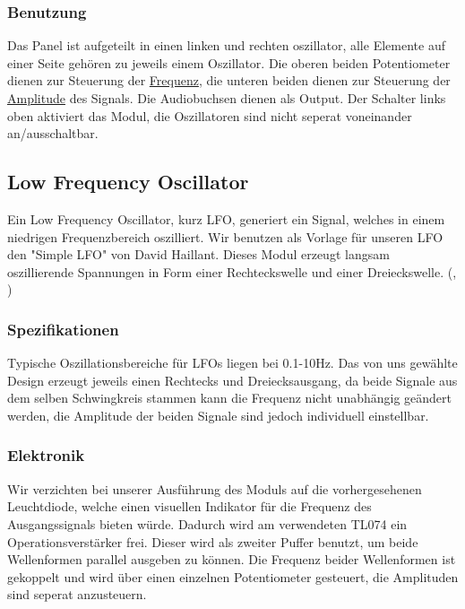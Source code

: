 \subsubsection{Benutzung}
\label{sec:orgfd612d0}
Das Panel ist aufgeteilt in einen linken und rechten oszillator, alle Elemente auf einer Seite gehören zu jeweils einem Oszillator. Die oberen beiden Potentiometer dienen zur Steuerung der \href{file:///home/felixp/Documents/diplomarbeit/dokumentation/content/theoretische\_grundlagen.org}{Frequenz}, die unteren beiden dienen zur Steuerung der \href{file:///home/felixp/Documents/diplomarbeit/dokumentation/content/theoretische\_grundlagen.org}{Amplitude} des Signals. Die Audiobuchsen dienen als Output. Der Schalter links oben aktiviert das Modul, die Oszillatoren sind nicht seperat voneinander an/ausschaltbar.

\subsection{Low Frequency Oscillator}
\label{sec:org6995e19}
Ein Low Frequency Oscillator, kurz LFO, generiert ein Signal, welches in einem niedrigen Frequenzbereich oszilliert. Wir benutzen als Vorlage für unseren LFO den "Simple LFO" von David Haillant. Dieses Modul erzeugt langsam oszillierende Spannungen in Form einer Rechteckswelle und einer Dreieckswelle.
(, )
\subsubsection{Spezifikationen}
\label{sec:org80c10bf}

Typische Oszillationsbereiche für LFOs liegen bei 0.1-10Hz. Das  von uns gewählte Design erzeugt jeweils einen Rechtecks und Dreiecksausgang, da beide Signale aus dem selben Schwingkreis stammen kann die Frequenz nicht unabhängig geändert werden, die Amplitude der beiden Signale sind jedoch individuell einstellbar.

\subsubsection{Elektronik}
\label{sec:orgcd341d8}
Wir verzichten bei unserer Ausführung des Moduls auf die vorhergesehenen Leuchtdiode, welche einen visuellen Indikator für die Frequenz des Ausgangssignals bieten würde. Dadurch wird am verwendeten TL074 ein Operationsverstärker frei. Dieser wird als zweiter Puffer benutzt, um beide Wellenformen parallel ausgeben zu können. Die Frequenz beider Wellenformen ist gekoppelt und wird über einen einzelnen Potentiometer gesteuert, die Amplituden sind seperat anzusteuern.

